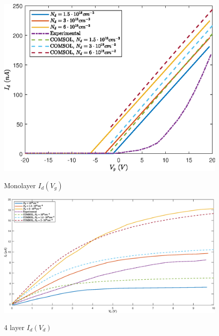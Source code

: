 \documentclass[12pt,a4paper,titlepage]{article}
\begin{document}
\begin{figure}[H]
	\centering
	\includegraphics[width=1\textwidth]{Grafici/monolayer_Id(Vg).eps} 
	\label{fig:monolayer_Id(Vg))}
	\caption{Monolayer $I_d(V_g)$}
\end{figure}

\begin{figure}[H]
	\centering
	\includegraphics[width=1\textwidth]{Grafici/4layer_Id(Vd).eps} 
	\label{fig:4layer_Id(Vd)}
	\caption{4 layer $I_d(V_d)$}
\end{figure}
\end{document}
